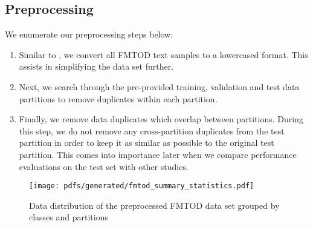 \subsection{Preprocessing}

We enumerate our preprocessing steps below:

\begin{enumerate}{}
  \item Similar to \citet{schwartz2018sopa}, we convert all FMTOD text samples
  to a lowercased format. This assists in simplifying the data set further.
  \item Next, we search through the pre-provided training, validation and test
  data partitions to remove duplicates within each partition.
  \item Finally, we remove data duplicates which overlap between partitions.
  During this step, we do not remove any cross-partition duplicates from the
  test partition in order to keep it as similar as possible to the original test
  partition. This comes into importance later when we compare performance
  evaluations on the test set with other studies.
\end{enumerate}

\begin{figure}[t]
  \centering
  \texttt{[image: pdfs/generated/fmtod\_summary\_statistics.pdf]}
  \caption{Data distribution of the preprocessed FMTOD data set grouped by
    classes and partitions}
  \label{fig:fmtod}
\end{figure}

